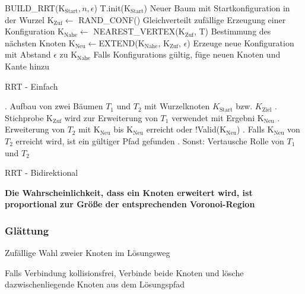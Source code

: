 \begin{algorithm}[H]
    \begin{algorithmic}
        \State BUILD\_RRT(K$_\text{Start},n,\epsilon$)
        \State T.init(K$_\text{Start}$) Neuer Baum mit Startkonfiguration in der Wurzel
        \State K$_\text{Zuf} \leftarrow$ RAND\_CONF() Gleichverteilt zufällige Erzeugung einer Konfiguration
        \State K$_\text{Nahe} \leftarrow$ NEAREST\_VERTEX(K$_\text{Zuf}$, T) Bestimmung des nächsten Knoten
        \State K$_\text{Neu} \leftarrow$EXTEND(K$_\text{Nahe}$, K$_\text{Zuf}$, $\epsilon$) Erzeuge neue Konfiguration mit Abstand $\epsilon$ zu K$_\text{Nahe}$
        \State Falls Konfigurations gültig, füge neuen Knoten und Kante hinzu
        \EndFor
        \caption{RRT - Einfach}
    \end{algorithmic}
\end{algorithm}

\begin{algorithm}[H]
    \begin{algorithmic}
        . Aufbau von zwei Bäumen $T_1$ und $T_2$ mit Wurzelknoten $K_\text{Start}$ bzw. $K_\text{Ziel}$
        . Stichprobe K$_\text{Zuf}$ wird zur Erweiterung von $T_1$ verwendet mit Ergebni K$_\text{Neu}$
        . Erweiterung von $T_2$ mit K$_\text{Neu}$ bis K$_\text{Neu}$ erreicht oder !Valid(K$_\text{Neu}$)
        . Falls K$_\text{Neu}$ von $T_2$ erreicht wird, ist ein gültiger Pfad gefunden
        . Sonst: Vertausche Rolle von $T_1$ und $T_2$

        \caption{RRT - Bidirektional}
    \end{algorithmic}
\end{algorithm}

\textbf{Die Wahrscheinlichkeit, dass ein Knoten erweitert wird, ist proportional zur Größe der
entsprechenden Voronoi-Region}

\subsubsection{Glättung}
\begin{compactitem}
    \item Zufällige Wahl zweier Knoten im Lösungsweg
    \item Falls Verbindung kollisionsfrei, Verbinde beide Knoten und lösche dazwischenliegende Knoten
    aus dem Lösungspfad
\end{compactitem}

